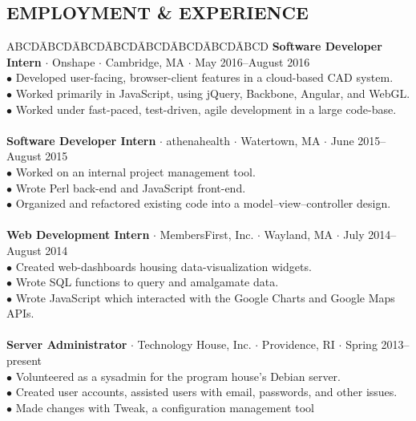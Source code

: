 \documentclass{res}
\newcommand{\myvspace}{\vspace{-0.09in}} %
\newcommand{\sbreak}{\\[-0.15in]}
\begin{document}
\begin{resume}
\section{EMPLOYMENT \& EXPERIENCE} %
   \myvspace
   \begin{tabbing}
        ABCD\=ABCD\=ABCD\=ABCD\=ABCD\=ABCD\=ABCD\=ABCD\kill
        {\bf Software Developer Intern} $\cdot$ Onshape $\cdot$ Cambridge, MA $\cdot$ May 2016--August 2016\\
            \>$\bullet$ Developed user-facing, browser-client features in a cloud-based CAD system.\\
            \>$\bullet$ Worked primarily in JavaScript, using jQuery, Backbone, Angular, and WebGL.\\
            \>$\bullet$ Worked under fast-paced, test-driven, agile development in a large code-base.\\
        \sbreak
        {\bf Software Developer Intern} $\cdot$ athenahealth $\cdot$ Watertown, MA $\cdot$ June 2015--August 2015\\
            \>$\bullet$ Worked on an internal project management tool.\\
            \>$\bullet$ Wrote Perl back-end and JavaScript front-end.\\
            \>$\bullet$ Organized and refactored existing code into a model--view--controller design.\\
        \sbreak
        {\bf Web Development Intern} $\cdot$ MembersFirst, Inc. $\cdot$ Wayland, MA $\cdot$ July 2014--August 2014\\
            \>$\bullet$ Created web-dashboards housing data-visualization widgets.\\
            \>$\bullet$ Wrote SQL functions to query and amalgamate data.\\
            \>$\bullet$ Wrote JavaScript which interacted with the Google Charts and Google Maps APIs.\\
        \sbreak
        {\bf Server Administrator} $\cdot$ Technology House, Inc. $\cdot$ Providence, RI $\cdot$ Spring 2013--present\\
            \>$\bullet$ Volunteered as a sysadmin for the program house's Debian server.\\
            \>$\bullet$ Created user accounts, assisted users with email, passwords, and other issues.\\
            \>$\bullet$ Made changes with Tweak, a configuration management tool\\

\end{tabbing}
\end{resume}
\end{document}
